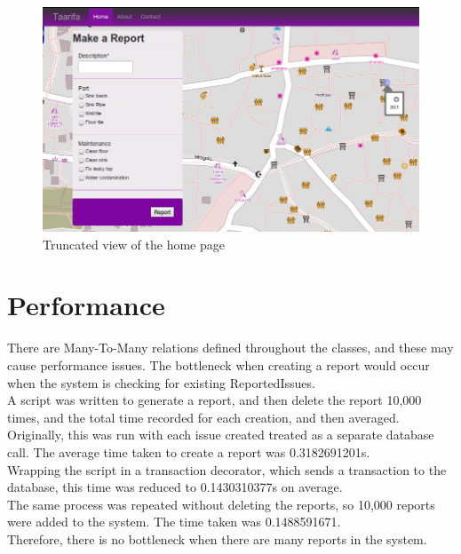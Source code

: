\begin{figure}
\centering
\includegraphics[scale=0.4]{img/home.png}
\caption{Truncated view of the home page}
\label{fig:rm:fac:home}
\end{figure}

\FloatBarrier
\section{Performance}
\label{sec:rm:fac:perf}

There are Many-To-Many relations defined throughout the classes, and these may cause performance issues. The bottleneck when creating a report would occur when the system is checking for existing ReportedIssues. \\

A script was written to generate a report, and then delete the report 10,000 times, and the total time recorded for each creation, and then averaged. \\

Originally, this was run with each issue created treated as a separate database call. The average time taken to create a report was 0.3182691201s. \\

Wrapping the script in a transaction decorator, which sends a transaction to the database, this time was reduced to 0.1430310377s on average. \\

The same process was repeated without deleting the reports, so 10,000 reports were added to the system. The time taken was 0.1488591671. \\

Therefore, there is no bottleneck when there are many reports in the system.